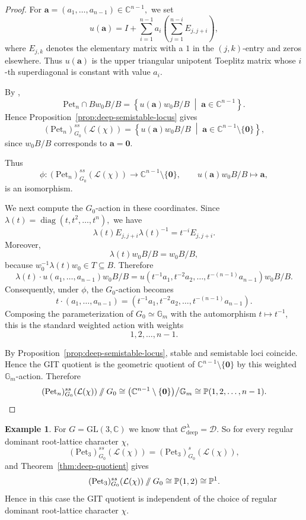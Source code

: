 \documentclass[12pt, reqno]{amsart}
\newcommand{\sslash}{\mathbin{/\mkern-6mu/}}
\theoremstyle{plain}
\numberwithin{equation}{section}
\theoremstyle{definition}
\newtheorem{example}{Example}
\begin{document}
\begin{proof}
For $\mathbf a=(a_1,\ldots,a_{n-1})\in\mathbb C^{n-1},$
we set
\[
u(\mathbf a)
=
I+
\sum_{i=1}^{n-1}
a_i
\left(
\sum_{j=1}^{n-i}E_{j,j+i}
\right),
\]
where \(E_{j,k}\) denotes the elementary matrix with a \(1\) in the
\((j,k)\)-entry and zeros elsewhere. Thus \(u(\mathbf a)\) is the upper triangular unipotent Toeplitz
matrix whose \(i\)-th superdiagonal is constant with value \(a_i\).

By \cite[Lemma~9(IV)]{Insko},
\[
\mathrm{Pet}_n\cap Bw_0B/B
=
\left\{
u(\mathbf a)w_0B/B
\;\middle|\;
\mathbf a\in\mathbb C^{n-1}
\right\}.
\]
Hence Proposition~\ref{prop:deep-semistable-locus} gives
\[
(\mathrm{Pet}_n)^{ss}_{G_0}(\mathcal L(\chi))
=
\left\{
u(\mathbf a)w_0B/B
\;\middle|\;
\mathbf a\in\mathbb C^{n-1}\setminus\{\mathbf0\}
\right\},
\]
since \(w_0B/B\) corresponds to \(\mathbf a=\mathbf0\).

Thus
\[
\phi:
(\mathrm{Pet}_n)^{ss}_{G_0}(\mathcal L(\chi))
\longrightarrow
\mathbb C^{n-1}\setminus\{\mathbf0\},
\qquad
u(\mathbf a)w_0B/B\longmapsto\mathbf a,
\]
is an isomorphism.

We next compute the \(G_0\)-action in these coordinates. Since $\lambda(t)
=
\operatorname{diag}(t,t^2,\ldots,t^n),$ we have
\[
\lambda(t)E_{j,j+i}\lambda(t)^{-1}
=
t^{-i}E_{j,j+i}.
\]
Moreover,
\[
\lambda(t)w_0B/B=w_0B/B,
\]
because \(w_0^{-1}\lambda(t)w_0\in T\subseteq B\). Therefore
\[
\lambda(t)\cdot
u(a_1,\ldots,a_{n-1})w_0B/B
=
u(t^{-1}a_1,t^{-2}a_2,\ldots,t^{-(n-1)}a_{n-1})
w_0B/B.
\]
Consequently, under \(\phi\), the \(G_0\)-action becomes
\[
t\cdot(a_1,\ldots,a_{n-1})
=
(t^{-1}a_1,t^{-2}a_2,\ldots,t^{-(n-1)}a_{n-1}).
\]
Composing the parameterization of \(G_0\simeq\mathbb G_m\) with the
automorphism \(t\mapsto t^{-1}\), this is the standard weighted action
with weights
\[
1,2,\ldots,n-1.
\]

By Proposition~\ref{prop:deep-semistable-locus}, stable and semistable
loci coincide. Hence the GIT quotient is the geometric quotient of
\(\mathbb C^{n-1}\setminus\{\mathbf0\}\) by this weighted
\(\mathbb G_m\)-action. Therefore
\[
(\mathrm{Pet}_n)^{ss}_{G_0}(\mathcal L(\chi))
\sslash G_0
\cong
\bigl(\mathbb C^{n-1}\setminus\{\mathbf0\}\bigr)
\big/\mathbb G_m
\cong
\mathbb P(1,2,\ldots,n-1).
\]
\end{proof}

\begin{example}\label{ex:GL3-deep}
For \(G=\mathrm{GL}(3,\mathbb C)\) we know that $\mathcal C_{\mathrm{deep}}^\lambda=\mathcal D.$ So for every regular dominant root-lattice character
\(\chi\),
\[
(\mathrm{Pet}_3)^{ss}_{G_0}(\mathcal L(\chi))
=
(\mathrm{Pet}_3)^s_{G_0}(\mathcal L(\chi)),
\]
and Theorem~\ref{thm:deep-quotient} gives
\[
(\mathrm{Pet}_3)^{ss}_{G_0}(\mathcal L(\chi))
\sslash G_0
\cong
\mathbb P(1,2)
\cong
\mathbb P^1.
\]
Hence in this case the GIT quotient is independent of the choice of regular
dominant root-lattice character \(\chi\).
\end{example}
\end{document}
